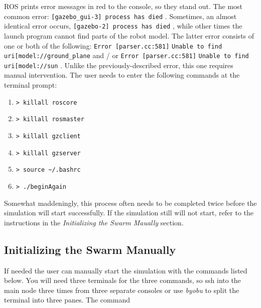 \documentclass[9pt,twocolumn,twoside]{../../styles/osajnl}
\begin{document}
ROS prints error messages in red to the console, so they stand out.  The most common error: {\color{red} \lstinline[style=BashInputStyle]![gazebo_gui-3] process has died! }.  Sometimes, an almost identical error occurs, {\color{red} \lstinline[style=BashInputStyle]![gazebo-2] process has died! }, while other times the launch program cannot find parts of the robot model.  The latter error consists of one or both of the following: {\color{red} \lstinline[style=BashInputStyle]!Error [parser.cc:581]! }{\lstinline[style=BashInputStyle]!Unable to find uri[model://ground_plane! } and / or {\color{red} \lstinline[style=BashInputStyle]!Error [parser.cc:581]! }{\lstinline[style=BashInputStyle]!Unable to find uri[model://sun! }.  Unlike the previously-described error, this one requires manual intervention.  The user needs to enter the following commands at the terminal prompt: 

\begin{enumerate}
\setlength\itemsep{-6pt}
\item {\lstinline[style=BashInputStyle]!> killall roscore! }
\item {\lstinline[style=BashInputStyle]!> killall rosmaster! }
\item {\lstinline[style=BashInputStyle]!> killall gzclient! } 
\item {\lstinline[style=BashInputStyle]!> killall gzserver! }
\item {\lstinline[style=BashInputStyle]!> source ~/.bashrc! } 
\item {\lstinline[style=BashInputStyle]!> ./beginAgain! }
\end{enumerate}

Somewhat maddeningly, this process often needs to be completed twice before the simulation will start successfully.  If the simulation still will not start, refer to the instructions in the \textit{Initializing the Swarm Maually} section.

\subsection{Initializing the Swarm Manually}


If needed the user can manually start the simulation with the commands listed below.  You will need three terminals for the three commands, so ssh into the main node three times from three separate consoles or use \textit{byobu} to split the terminal into three panes.  The command
\end{document}
